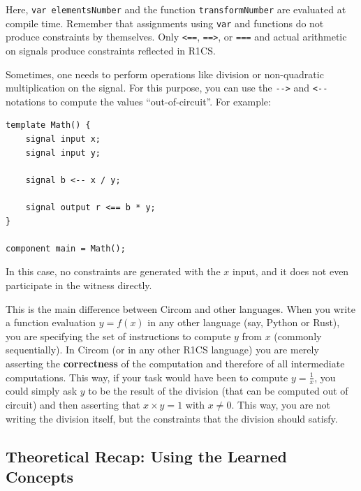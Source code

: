 \documentclass[../lecture-notes.tex]{subfiles}
\begin{document}
    Here, \texttt{var elementsNumber} and the function \texttt{transformNumber}
    are evaluated at compile time. Remember that assignments using \texttt{var} and
    functions do not produce constraints by themselves. Only \texttt{<==},
    \texttt{==>}, or \texttt{===} and actual arithmetic on signals produce
    constraints reflected in R1CS.

    \begin{remark}
        Sometimes, one needs to perform operations like division or non-quadratic multiplication on the signal.
        For this purpose, you can use the \texttt{{-}->} and \texttt{<-{-}} notations to compute the values ``out-of-circuit''. For example:

        \begin{lstlisting}[language=Circom,numbers=none]
template Math() {
    signal input x;
    signal input y;

    signal b <-- x / y;

    signal output r <== b * y;
}

component main = Math();
        \end{lstlisting}

        In this case, no constraints are generated with the $x$ input, and it does not even participate in the witness directly.
    \end{remark}

    \begin{remark}
        This is the main difference between Circom and other languages. When you 
        write a function evaluation $y = f(x)$ in any other language (say, Python or Rust),
        you are specifying the set of instructions to compute $y$ from $x$ (commonly 
        sequentially). In Circom (or in any other R1CS language) you are merely asserting 
        the \textbf{correctness} of the computation and therefore of all 
        intermediate computations. This way, if your task would have been to compute 
        $y = \frac{1}{x}$, you could simply ask $y$ to be the result of the division
        (that can be computed out of circuit) and then asserting that $x \times y = 1$
        with $x \neq 0$. This way, you are not writing the division itself, but
        the constraints that the division should satisfy.
    \end{remark}

    \subsection{Theoretical Recap: Using the Learned Concepts}
\end{document}
